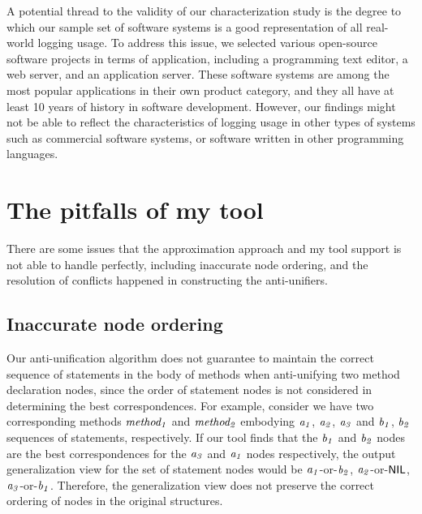 A potential thread to the validity of our characterization study is the degree to which our sample set of software systems is a good representation of all real-world logging usage. To address this issue, we selected various open-source software projects in terms of application, including a programming text editor, a web server, and an application server. These software systems are among the most popular applications in their own product category, and they all have at least 10 years of history in software development. However, our findings might not be able to reflect the characteristics of logging usage in other types of systems such as commercial software systems, or software written in other programming languages.

\section{The pitfalls of my tool}  \label{limitations}
There are some issues that the approximation approach and my tool support is not able to handle perfectly, including inaccurate node ordering, and the resolution of conflicts happened in constructing the anti-unifiers.

\subsection{Inaccurate node ordering}  \label{mismatch}
Our anti-unification algorithm does not guarantee to maintain the correct sequence of statements in the body of methods when anti-unifying two method declaration nodes, since the order of statement nodes is not considered in determining the best correspondences. For example, consider we have two corresponding methods $\mathit{method_1}$ and $\mathit{method_2}$ embodying {$\mathit{a_1}$, $\mathit{a_2}$, $\mathit{a_3}$} and {$\mathit{b_1}$, $\mathit{b_2}$} sequences of statements, respectively. If our tool finds that the $\mathit{b_1}$ and $\mathit{b_2}$ nodes are the best correspondences for the $\mathit{a_3}$ and $\mathit{a_1}$ nodes respectively, the output generalization view for the set of statement nodes would be {$\mathit{a_1}$-or-$\mathit{b_2}$, $\mathit{a_2}$-or-$\textsf{NIL}$, $\mathit{a_3}$-or-$\mathit{b_1}$}. Therefore, the generalization view does not preserve the correct ordering of nodes in the original structures.


